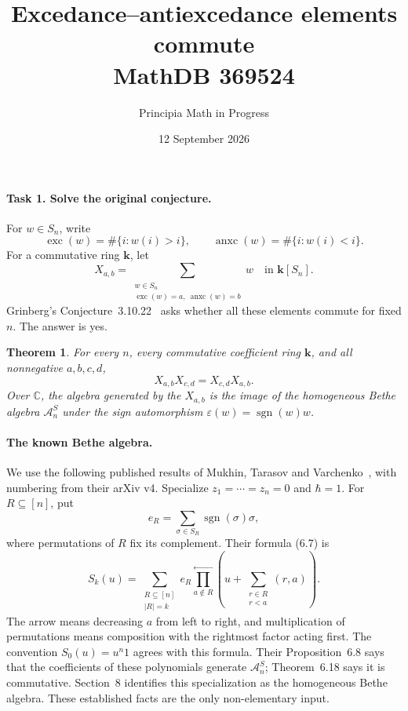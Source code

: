 \documentclass[11pt]{article}
\title{Excedance--antiexcedance elements commute\\
\large MathDB 369524}
\author{Principia Math in Progress}
\date{12 September 2026}
\newtheorem{theorem}{Theorem}
\DeclareMathOperator{\exc}{exc}
\DeclareMathOperator{\anxc}{anxc}
\DeclareMathOperator{\sgn}{sgn}
\newcommand{\A}{\mathcal A_n^S}
\begin{document}
\maketitle

\paragraph{Task 1. Solve the original conjecture.}
For \(w\in S_n\), write
\[
\exc(w)=\#\{i:w(i)>i\},\qquad
\anxc(w)=\#\{i:w(i)<i\}.
\]
For a commutative ring \(\mathbf k\), let
\[
X_{a,b}=\sum_{\substack{w\in S_n\\\exc(w)=a,\ \anxc(w)=b}}w
\quad\text{in }\mathbf k[S_n].
\]
Grinberg's Conjecture~3.10.22~\cite{grinberg} asks whether all these
elements commute for fixed \(n\). The answer is yes.

\begin{theorem}
For every \(n\), every commutative coefficient ring \(\mathbf k\), and all
nonnegative \(a,b,c,d\),
\[
X_{a,b}X_{c,d}=X_{c,d}X_{a,b}.
\]
Over \(\mathbb C\), the algebra generated by the \(X_{a,b}\) is the image
of the homogeneous Bethe algebra \(\A\) under the sign automorphism
\(\varepsilon(w)=\sgn(w)w\).
\end{theorem}

\paragraph{The known Bethe algebra.}
We use the following published results of Mukhin, Tarasov and
Varchenko~\cite{mtv}, with numbering from their arXiv v4.
Specialize \(z_1=\cdots=z_n=0\) and \(\hbar=1\).
For \(R\subseteq[n]\), put
\[
e_R=\sum_{\sigma\in S_R}\sgn(\sigma)\sigma,
\]
where permutations of \(R\) fix its complement. Their formula (6.7) is
\begin{equation}\label{eq:transfer}
S_k(u)=
\sum_{\substack{R\subseteq[n]\\|R|=k}} e_R
\prod_{a\notin R}^{\longleftarrow}
\left(u+\sum_{\substack{r\in R\\r<a}}(r,a)\right).
\end{equation}
The arrow means decreasing \(a\) from left to right, and multiplication
of permutations means composition with the rightmost factor acting first.
The convention \(S_0(u)=u^n1\) agrees with this formula.
Their Proposition~6.8 says that the coefficients of these polynomials
generate \(\A\); Theorem~6.18 says it is commutative.
Section~8 identifies this specialization as the homogeneous Bethe algebra.
These established facts are the only non-elementary input.
\end{document}
